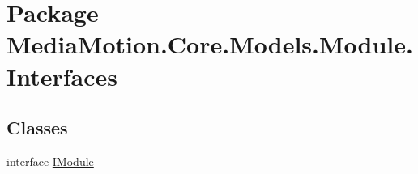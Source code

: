 \hypertarget{namespace_media_motion_1_1_core_1_1_models_1_1_module_1_1_interfaces}{\section{Package Media\+Motion.\+Core.\+Models.\+Module.\+Interfaces}
\label{namespace_media_motion_1_1_core_1_1_models_1_1_module_1_1_interfaces}
}
\subsection*{Classes}
\begin{DoxyCompactItemize}
\item 
interface \hyperlink{interface_media_motion_1_1_core_1_1_models_1_1_module_1_1_interfaces_1_1_i_module}{I\+Module}
\end{DoxyCompactItemize}
